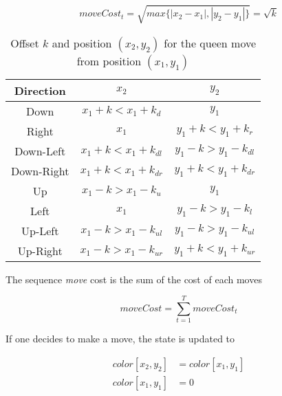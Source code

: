 \documentclass{article} %
\begin{document}
  \[ moveCost_t = \sqrt{max\{|x_{2}-x_{1}|, |y_{2}-y_{1}|\}} = \sqrt{k} \]

  \begin{table}
    \centering
    \begin{tabular}{|c|c|c|}
      \hline
      \textbf{Direction} & $x_2$ & $y_2$ \\
      \hline
      Down & $x_1 + k < x_1 + k_d$ & $y_1$ \\
      \hline
      Right & $x_1$ & $y_1 + k < y_1 + k_r$ \\
      \hline
      Down-Left & $x_1 + k < x_1 + k_{dl}$ & $y_1 - k > y_1 - k_{dl}$ \\
      \hline
      Down-Right & $x_1 + k < x_1 + k_{dr}$ & $y_1 + k < y_1 + k_{dr}$ \\
      \hline
      Up & $x_1 - k > x_1 - k_u$ & $y_1$ \\
      \hline
      Left & $x_1$ & $y_1 - k > y_1 - k_l$ \\
      \hline
      Up-Left & $x_1 - k > x_1 - k_{ul}$ & $y_1 - k > y_1 - k_{ul}$ \\
      \hline
      Up-Right & $x_1 - k > x_1 - k_{ur}$ & $y_1 + k < y_1 + k_{ur}$ \\
      \hline
    \end{tabular}
    \caption{Offset $k$ and position $(x_2, y_2)$ for the queen move from position $(x_1, y_1)$}
    \label{tab:QueenAttackMove}
  \end{table}
  
  The sequence \textit{move} cost is the sum of the cost of each moves

  \[ moveCost = \sum_{t=1}^{T} moveCost_t \]

  If one decides to make a move, the state is updated to

  \begin{align*}
    color[x_2,y_2] &= color[x_1,y_1] \\
    color[x_1,y_1] &= 0
  \end{align*}

  
\end{document}
